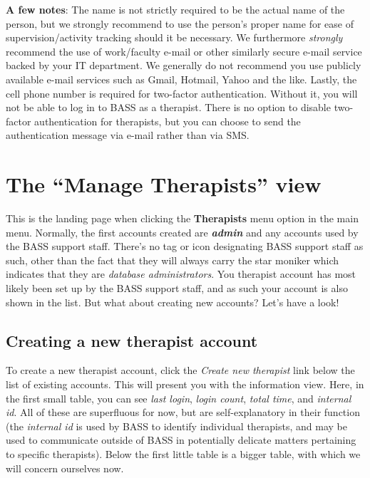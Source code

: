 \documentclass[
]{book}
\begin{document}
\textbf{A few notes}: The name is not strictly required to be the actual name of the person, but we strongly recommend to use the person's proper name for ease of supervision/activity tracking should it be necessary.
We furthermore \emph{strongly} recommend the use of work/faculty e-mail or other similarly secure e-mail service backed by your IT department. We generally do not recommend you use publicly available e-mail services such as Gmail, Hotmail, Yahoo and the like.
Lastly, the cell phone number is required for two-factor authentication. Without it, you will not be able to log in to BASS as a therapist. There is no option to disable two-factor authentication for therapists, but you can choose to send the authentication message via e-mail rather than via SMS.

\section{The ``Manage Therapists'' view}\label{the-manage-therapists-view}

This is the landing page when clicking the \textbf{Therapists} menu option in the main menu. Normally, the first accounts created are \textbf{\emph{admin}} and any accounts used by the BASS support staff. There's no tag or icon designating BASS support staff as such, other than the fact that they will always carry the star moniker which indicates that they are \emph{database administrators}.
You therapist account has most likely been set up by the BASS support staff, and as such your account is also shown in the list. But what about creating new accounts? Let's have a look!

\subsection{Creating a new therapist account}\label{creating-a-new-therapist-account}

To create a new therapist account, click the \emph{Create new therapist} link below the list of existing accounts. This will present you with the information view. Here, in the first small table, you can see \emph{last login}, \emph{login count}, \emph{total time}, and \emph{internal id}. All of these are superfluous for now, but are self-explanatory in their function (the \emph{internal id} is used by BASS to identify individual therapists, and may be used to communicate outside of BASS in potentially delicate matters pertaining to specific therapists).
Below the first little table is a bigger table, with which we will concern ourselves now.
\end{document}
